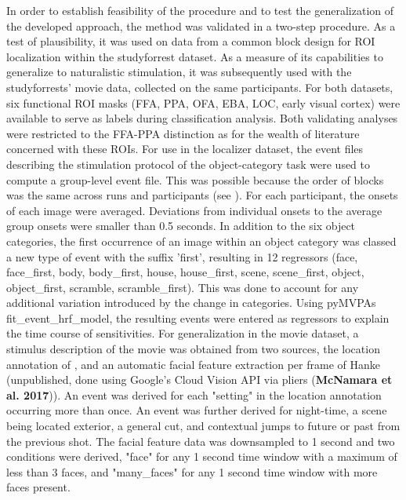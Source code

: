 \documentclass[a4paper, 12pt]{scrreprt}
\begin{document}
In order to establish feasibility of the procedure and to test the generalization of the developed approach, the method was validated in a two-step procedure. As a test of plausibility, it was used on data from a common block design for ROI localization within the studyforrest dataset. As a measure of its capabilities to generalize to naturalistic stimulation, it was subsequently used with the studyforrests' movie data, collected on the same participants. For both datasets, six functional ROI masks (FFA, PPA, OFA, EBA, LOC, early visual cortex) were available to serve as labels during classification analysis. Both validating analyses were restricted to the FFA-PPA distinction as for the wealth of literature concerned with these ROIs. \newline
For use in the localizer dataset, the event files describing the stimulation protocol of the object-category task were used to compute a group-level event file. This was possible because the order of blocks was the same across runs and participants (see \cite{sengupta2016studyforrest}). For each participant, the onsets of each image were averaged. Deviations from individual onsets to the average group onsets were smaller than 0.5 seconds. In addition to the six object categories, the first occurrence of an image within an object category was classed a new type of event with the suffix 'first', resulting in 12 regressors (face, face\_first, body, body\_first, house, house\_first, scene, scene\_first, object, object\_first, scramble, scramble\_first). This was done to account for any additional variation introduced by the change in categories. Using pyMVPAs fit\_event\_hrf\_model, the resulting events were entered as regressors to explain the time course of sensitivities. \newline
For generalization in the movie dataset, a stimulus description of the movie was obtained from two sources, the location annotation of \textcite{hausler2016annotation}, and an automatic facial feature extraction per frame of Hanke (unpublished, done using Google's Cloud Vision API via pliers (\textbf{McNamara et al. 2017})). An event was derived for each "setting" in the location annotation occurring more than once. An event was further derived for night-time, a scene being located exterior, a general cut, and contextual jumps to future or past from the previous shot. The facial feature data was downsampled to 1 second and two conditions were derived, "face" for any 1 second time window with a maximum of less than 3 faces, and "many\_faces" for any 1 second time window with more faces present.
\end{document}
